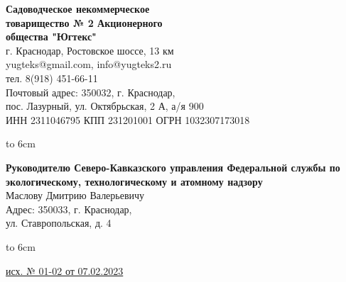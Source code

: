 \noindent\parbox[l][71mm]{80mm}
{
	 \begin{center}
 {\small \textbf{Садоводческое некоммерческое\\ товарищество
 	№  2 Акционерного\\ общества "Югтекс"\\
 }}
 \footnotesize{г. Краснодар, Ростовское шоссе, 13 км\\
 	yugteks@gmail.com, info@yugteks2.ru\\
 	тел. 8(918) 451-66-11\\
 	Почтовый адрес: 350032, г. Краснодар,\\ пос. Лазурный, ул. Октябрьская, 2 А, а/я   900
  }\\
 {ИНН 2311046795 КПП 231201001 ОГРН 1032307173018}
		\end{center}
\hbox to 6cm{ }}\hfill
\parbox[l][71mm]{65mm}
{ \begin{center}
	\small{
	\textbf{Руководителю	Северо-Кавказского управления Федеральной службы по экологическому, технологическому и атомному надзору}\\
	Маслову Дмитрию Валерьевичу\\
	\vspace{3mm}
 {\footnotesize Адрес: 350033, г. Краснодар,\\ ул. Ставропольская, д. 4}

	}
\end{center}
\hbox to 6cm{ }}
\linebreak
\vspace{-12mm}

\underline{исх. № 01-02 от 07.02.2023} 